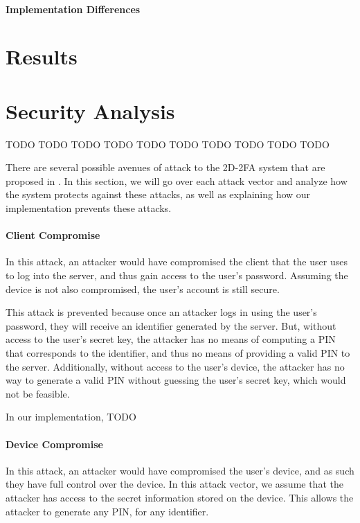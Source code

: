 \documentclass[11pt]{article} %
\begin{document}
\paragraph{Implementation Differences}


\section{Results}



\section{Security Analysis}

TODO TODO TODO TODO TODO TODO TODO TODO TODO TODO

There are several possible avenues of attack to the 2D-2FA system that
are proposed in \cite{shirvanian2d2fa}. In this section, we will go over
each attack vector and analyze how the system protects against these
attacks, as well as explaining how our implementation prevents these
attacks. 

\paragraph{Client Compromise}
In this attack, an attacker would have compromised the client that the
user uses to log into the server, and thus gain access to the user's
password. Assuming the device is not also compromised, the user's
account is still secure. 

This attack is prevented because once an attacker logs in using the
user's password, they will receive an identifier generated by the
server. But, without access to the user's secret key, the attacker has
no means of computing a PIN that corresponds to the identifier, and
thus no means of providing a valid PIN to the server. Additionally,
without access to the user's device, the attacker has no way to generate
a valid PIN without guessing the user's secret key, which would not be
feasible. 

In our implementation, TODO

\paragraph{Device Compromise}
In this attack, an attacker would have compromised the user's device,
and as such they have full control over the device. In this attack
vector, we assume that the attacker has access to the secret information
stored on the device. This allows the attacker to generate any PIN, for
any identifier.
\end{document}

